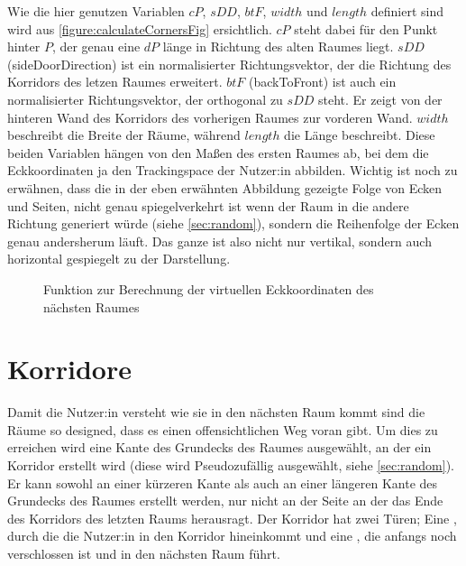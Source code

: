 
Wie die hier genutzen Variablen $cP$, $sDD$, $btF$, $width$ und $length$ definiert sind wird aus \autoref{figure:calculateCornersFig} ersichtlich. $cP$ steht dabei für den Punkt hinter $P$, der genau eine $dP$ länge in Richtung des alten Raumes liegt. $sDD$ (sideDoorDirection) ist ein normalisierter Richtungsvektor, der die Richtung des Korridors des letzen Raumes erweitert. $btF$ (backToFront) ist auch ein normalisierter Richtungsvektor, der orthogonal zu $sDD$ steht. Er zeigt von der hinteren Wand des Korridors des vorherigen Raumes zur vorderen Wand. $width$ beschreibt die Breite der Räume, während $length$ die Länge beschreibt. Diese beiden Variablen hängen von den Maßen des ersten Raumes ab, bei dem die Eckkoordinaten ja den Trackingspace der Nutzer:in abbilden. Wichtig ist noch zu erwähnen, dass die in der eben erwähnten Abbildung gezeigte Folge von Ecken und Seiten, nicht genau spiegelverkehrt ist wenn der Raum in die andere Richtung generiert würde (siehe \autoref{sec:random}), sondern die Reihenfolge der Ecken genau andersherum läuft. Das ganze ist also nicht nur vertikal, sondern auch horizontal gespiegelt zu der Darstellung.

\begin{figure}[H]
    \centering
    \caption{Funktion zur Berechnung der virtuellen Eckkoordinaten des nächsten Raumes}
    \label{figure:calculateNewCornersScript}
\end{figure}


\section{Korridore}
\label{sec:corridor}
Damit die Nutzer:in versteht wie sie in den nächsten Raum kommt sind die Räume so designed, dass es einen offensichtlichen Weg voran gibt. Um dies zu erreichen wird eine Kante des Grundecks des Raumes ausgewählt, an der ein Korridor erstellt wird (diese wird Pseudozufällig ausgewählt, siehe \autoref{sec:random}). Er kann sowohl an einer kürzeren Kante als auch an einer längeren Kante des Grundecks des Raumes erstellt werden, nur nicht an der Seite an der das Ende des Korridors des letzten Raums herausragt.
Der Korridor hat zwei Türen; Eine , durch die die Nutzer:in in den Korridor hineinkommt und eine , die anfangs noch verschlossen ist und in den nächsten Raum führt.

